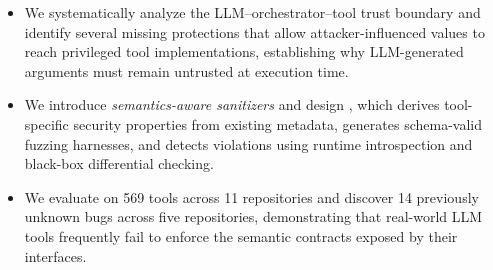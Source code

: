 \begin{itemize}
    \item We systematically analyze the LLM--orchestrator--tool trust boundary
    and identify several missing protections that allow attacker-influenced
    values to reach privileged tool implementations, establishing why
    LLM-generated arguments must remain untrusted at execution time.

    \item We introduce \emph{semantics-aware sanitizers} and design
    \project{}, which derives tool-specific security properties from existing
    metadata, generates schema-valid fuzzing harnesses, and detects violations
    using runtime introspection and black-box differential checking.

    \item We evaluate \project{} on 569 tools across 11 repositories and
    discover 14 previously unknown bugs across five repositories,
    demonstrating that real-world LLM tools frequently fail to enforce the
    semantic contracts exposed by their interfaces.
\end{itemize}

